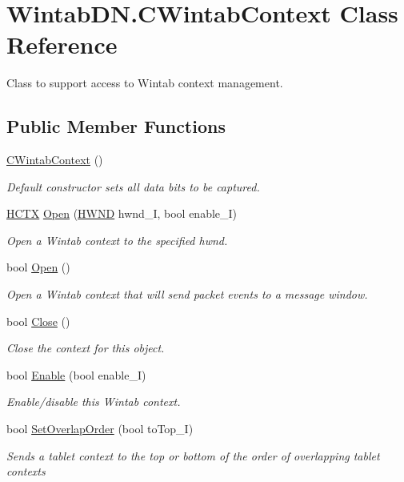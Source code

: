 \hypertarget{class_wintab_d_n_1_1_c_wintab_context}{}\section{Wintab\+D\+N.\+C\+Wintab\+Context Class Reference}
\label{class_wintab_d_n_1_1_c_wintab_context}


Class to support access to Wintab context management.  


\subsection*{Public Member Functions}
\begin{DoxyCompactItemize}
\item 
\mbox{\hyperlink{class_wintab_d_n_1_1_c_wintab_context_ae2ce09949d3d633790254555f9db2d49}{C\+Wintab\+Context}} ()
\begin{DoxyCompactList}\small\item\em Default constructor sets all data bits to be captured. \end{DoxyCompactList}\item 
\mbox{\hyperlink{class_wintab_d_n_1_1_h_c_t_x}{H\+C\+TX}} \mbox{\hyperlink{class_wintab_d_n_1_1_c_wintab_context_a4bb06f01ce05bcac01ed611ea7d241d8}{Open}} (\mbox{\hyperlink{struct_wintab_d_n_1_1_h_w_n_d}{H\+W\+ND}} hwnd\+\_\+I, bool enable\+\_\+I)
\begin{DoxyCompactList}\small\item\em Open a Wintab context to the specified hwnd. \end{DoxyCompactList}\item 
bool \mbox{\hyperlink{class_wintab_d_n_1_1_c_wintab_context_a1522d857d00373971e9c0e010ae9e756}{Open}} ()
\begin{DoxyCompactList}\small\item\em Open a Wintab context that will send packet events to a message window. \end{DoxyCompactList}\item 
bool \mbox{\hyperlink{class_wintab_d_n_1_1_c_wintab_context_a53d935082727bc049f9d817363e6200f}{Close}} ()
\begin{DoxyCompactList}\small\item\em Close the context for this object. \end{DoxyCompactList}\item 
bool \mbox{\hyperlink{class_wintab_d_n_1_1_c_wintab_context_a580c1e6691c4c58c8d54d429e7d7ebd8}{Enable}} (bool enable\+\_\+I)
\begin{DoxyCompactList}\small\item\em Enable/disable this Wintab context. \end{DoxyCompactList}\item 
bool \mbox{\hyperlink{class_wintab_d_n_1_1_c_wintab_context_a26240e1cdf96ad7859a8fae08a41e412}{Set\+Overlap\+Order}} (bool to\+Top\+\_\+I)
\begin{DoxyCompactList}\small\item\em Sends a tablet context to the top or bottom of the order of overlapping tablet contexts \end{DoxyCompactList}\end{DoxyCompactItemize}
